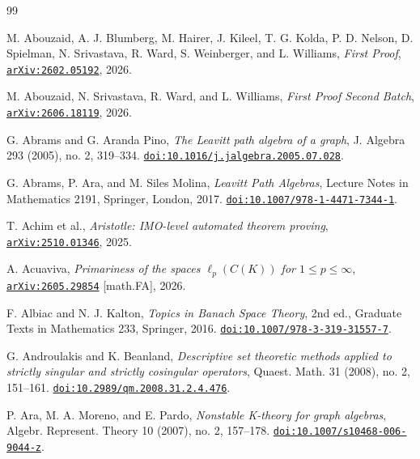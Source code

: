 \documentclass[11pt,reqno]{amsart}
\theoremstyle{plain}
\theoremstyle{definition}
\begin{document}
\clearpage
{}
\providecommand{\bibdoi}[1]{%
  \href{https://doi.org/#1}{\nolinkurl{doi:#1}}}
\providecommand{\bibarxiv}[1]{%
  \href{https://arxiv.org/abs/#1}{\nolinkurl{arXiv:#1}}}

\begin{thebibliography}{99}

M. Abouzaid, A. J. Blumberg, M. Hairer, J. Kileel, T. G. Kolda,
P. D. Nelson, D. Spielman, N. Srivastava, R. Ward, S. Weinberger,
and L. Williams,
\newblock \emph{First Proof},
\newblock \bibarxiv{2602.05192}, 2026.

M. Abouzaid, N. Srivastava, R. Ward, and L. Williams,
\newblock \emph{First Proof Second Batch},
\newblock \bibarxiv{2606.18119}, 2026.

G. Abrams and G. Aranda Pino,
\newblock \emph{The Leavitt path algebra of a graph},
\newblock J. Algebra 293 (2005), no. 2, 319--334.
\newblock \bibdoi{10.1016/j.jalgebra.2005.07.028}.

G. Abrams, P. Ara, and M. Siles Molina,
\newblock \emph{Leavitt Path Algebras},
\newblock Lecture Notes in Mathematics 2191, Springer, London, 2017.
\newblock \bibdoi{10.1007/978-1-4471-7344-1}.

T. Achim et al.,
\newblock \emph{Aristotle: IMO-level automated theorem proving},
\newblock \bibarxiv{2510.01346}, 2025.

A. Acuaviva,
\newblock \emph{Primariness of the spaces $\ell_p(C(K))$ for
$1 \leq p \leq \infty$},
\newblock \bibarxiv{2605.29854} [math.FA], 2026.

F. Albiac and N. J. Kalton,
\newblock \emph{Topics in Banach Space Theory},
\newblock 2nd ed., Graduate Texts in Mathematics 233, Springer, 2016.
\newblock \bibdoi{10.1007/978-3-319-31557-7}.

G. Androulakis and K. Beanland,
\newblock \emph{Descriptive set theoretic methods applied to strictly singular and strictly cosingular operators},
\newblock Quaest. Math. 31 (2008), no. 2, 151--161.
\newblock \bibdoi{10.2989/qm.2008.31.2.4.476}.

P. Ara, M. A. Moreno, and E. Pardo,
\newblock \emph{Nonstable K-theory for graph algebras},
\newblock Algebr. Represent. Theory 10 (2007), no. 2, 157--178.
\newblock \bibdoi{10.1007/s10468-006-9044-z}.


\end{thebibliography}
\end{document}
